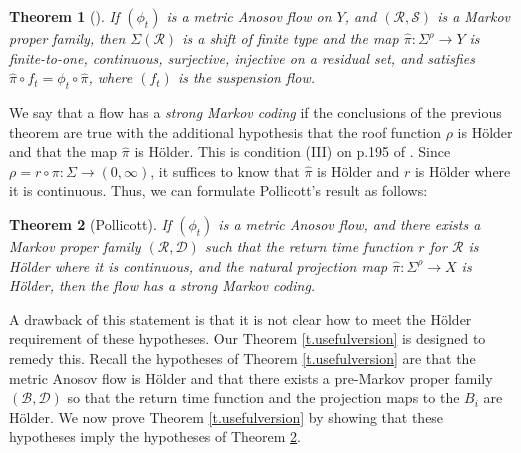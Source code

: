 \documentclass[10pt]{amsart}
\let\mathcal\mathscr
\newtheorem{thm}{Theorem}[section]
\theoremstyle{definition}
\numberwithin{equation}{section}
\newcommand\DDD{\mathcal D}
\newcommand\BBB{\mathcal B}
\newcommand\RRR{\mathcal R}
\newcommand\SSS{\mathcal S}
\begin{document}
\begin{thm}[{\cite[Th.\,1]{pollicott}}]
If $(\phi_t)$ is a metric Anosov flow on $Y$, and $(\RRR, \SSS)$ is a Markov proper family, then $\Sigma(\RRR)$ is a shift of finite type and the map $\hat\pi: \Sigma^\rho \to Y$ is finite-to-one, continuous, surjective, injective on a residual set, and satisfies $\hat \pi \circ f_t = \phi_t \circ \hat \pi$, where $(f_t)$ is the suspension flow.
\end{thm}

We say that a flow has a \emph{strong Markov coding} if the conclusions of the previous theorem are true with the additional hypothesis that the roof function $\rho$ is Hölder and that the map $\hat \pi$ is Hölder. This is condition (III) on p.195 of \cite{pollicott}. Since $\rho= r \circ \pi: \Sigma \to (0, \infty)$, it suffices to know that $\hat\pi$ is Hölder and $r$ is Hölder where it is continuous. Thus, we can formulate Pollicott's result as follows:

\begin{thm} [Pollicott] \label{t.pollicott}
If $(\phi_t)$ is a metric Anosov flow, and there exists a Markov proper family $(\RRR, \DDD)$ such that the return time function $r$ for $\RRR$ is Hölder where it is continuous, and the natural projection map $\hat \pi: \Sigma^\rho \to X$ is Hölder, then the flow has a strong Markov coding.
\end{thm}

A drawback of this statement is that it is not clear how to meet the Hölder \hbox{requirement} of these hypotheses. Our Theorem \ref{t.usefulversion} is designed to remedy this. Recall the hypotheses of Theorem \ref{t.usefulversion} are that the metric Anosov flow is Hölder and that there exists a pre-Markov proper family $(\BBB, \DDD)$ so that the return time function and the projection maps to the $B_i$ are Hölder. We now prove Theorem \ref{t.usefulversion} by showing that these hypotheses imply the hypotheses of Theorem \ref{t.pollicott}.
\end{document}
